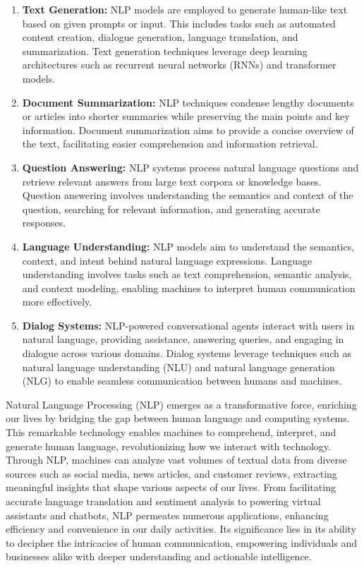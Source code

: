 \begin{enumerate}
	\item \textbf{Text Generation:} NLP models are employed to generate human-like text based on given prompts or input. This includes tasks such as automated content creation, dialogue generation, language translation, and summarization. Text generation techniques leverage deep learning architectures such as recurrent neural networks (RNNs) and transformer models.
	
	\item \textbf{Document Summarization:} NLP techniques condense lengthy documents or articles into shorter summaries while preserving the main points and key information. Document summarization aims to provide a concise overview of the text, facilitating easier comprehension and information retrieval.
	
	\item \textbf{Question Answering:} NLP systems process natural language questions and retrieve relevant answers from large text corpora or knowledge bases. Question answering involves understanding the semantics and context of the question, searching for relevant information, and generating accurate responses.
	
	\item \textbf{Language Understanding:} NLP models aim to understand the semantics, context, and intent behind natural language expressions. Language understanding involves tasks such as text comprehension, semantic analysis, and context modeling, enabling machines to interpret human communication more effectively.

	\item \textbf{Dialog Systems:} NLP-powered conversational agents interact with users in natural language, providing assistance, answering queries, and engaging in dialogue across various domains. Dialog systems leverage techniques such as natural language understanding (NLU) and natural language generation (NLG) to enable seamless communication between humans and machines.
\end{enumerate}
Natural Language Processing (NLP) emerges as a transformative force, enriching our lives by bridging the gap between human language and computing systems. This remarkable technology enables machines to comprehend, interpret, and generate human language, revolutionizing how we interact with technology. Through NLP, machines can analyze vast volumes of textual data from diverse sources such as social media, news articles, and customer reviews, extracting meaningful insights that shape various aspects of our lives. From facilitating accurate language translation and sentiment analysis to powering virtual assistants and chatbots, NLP permeates numerous applications, enhancing efficiency and convenience in our daily activities. Its significance lies in its ability to decipher the intricacies of human communication, empowering individuals and businesses alike with deeper understanding and actionable intelligence.

